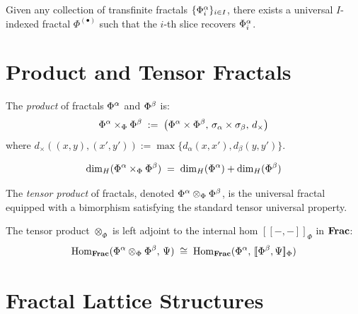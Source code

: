 \begin{theorem}
\label{thm:multi-existence}
Given any collection of transfinite fractals $\{\Phi^{\alpha}_i\}_{i \in I}$,
there exists a universal $I$-indexed fractal $\Phi^{(\bullet)}$ such that
the $i$-th slice recovers $\Phi^{\alpha}_i$.
\end{theorem}

\section{Product and Tensor Fractals}

\begin{definition}
\label{def:product-frac}
The \emph{product} of fractals $\Phi^{\alpha}$ and $\Phi^{\beta}$ is:
\[
    \Phi^{\alpha} \times_\Phi \Phi^{\beta} \;:=\;
    \bigl(\Phi^{\alpha} \times \Phi^{\beta},\,
    \sigma_\alpha \times \sigma_\beta,\, d_\times\bigr)
\]
where $d_\times((x,y),(x',y')) := \max\{d_\alpha(x,x'), d_\beta(y,y')\}$.
\end{definition}

\begin{proposition}
\label{prop:product-dim}
\[
    \dim_H(\Phi^{\alpha} \times_\Phi \Phi^{\beta}) \;=\;
    \dim_H(\Phi^{\alpha}) + \dim_H(\Phi^{\beta})
\]
\end{proposition}

\begin{definition}
\label{def:tensor-frac}
The \emph{tensor product} of fractals, denoted $\Phi^{\alpha} \otimes_\Phi \Phi^{\beta}$,
is the universal fractal equipped with a bimorphism satisfying the standard
tensor universal property.
\end{definition}

\begin{theorem}
\label{thm:tensor-adjunction}
The tensor product $\otimes_\Phi$ is left adjoint to the internal hom
$[\![-,-]\!]_\Phi$ in $\mathbf{Frac}$:
\[
    \mathrm{Hom}_{\mathbf{Frac}}(\Phi^{\alpha} \otimes_\Phi \Phi^{\beta},\, \Psi)
    \;\cong\;
    \mathrm{Hom}_{\mathbf{Frac}}(\Phi^{\alpha},\, [\![\Phi^{\beta}, \Psi]\!]_\Phi)
\]
\end{theorem}

\section{Fractal Lattice Structures}

